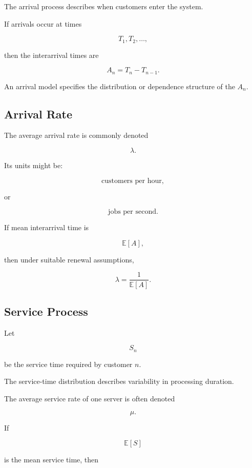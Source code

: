 The arrival process describes when customers enter the system.

If arrivals occur at times

\[
T_1,T_2,\ldots,
\]

then the interarrival times are

\[
\boxed{
A_n
=
T_n-T_{n-1}.
}
\]

An arrival model specifies the distribution or dependence structure of the
\(A_n\).

\subsection{Arrival Rate}
\label{subsec:queue-arrival-rate}

The average arrival rate is commonly denoted

\[
\boxed{
\lambda.
}
\]

Its units might be:

\[
\boxed{
\text{customers per hour},
}
\]

or

\[
\boxed{
\text{jobs per second}.
}
\]

If mean interarrival time is

\[
\mathbb{E}[A],
\]

then under suitable renewal assumptions,

\[
\boxed{
\lambda
=
\frac{1}{\mathbb{E}[A]}.
}
\]

\subsection{Service Process}
\label{subsec:queue-service-process}

Let

\[
S_n
\]

be the service time required by customer \(n\).

The service-time distribution describes variability in processing
duration.

The average service rate of one server is often denoted

\[
\boxed{
\mu.
}
\]

If

\[
\mathbb{E}[S]
\]

is the mean service time, then

